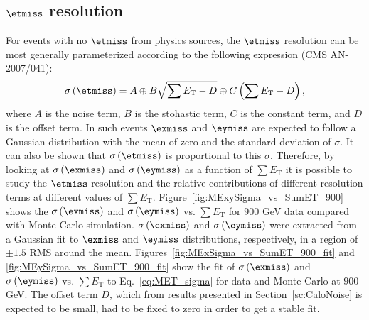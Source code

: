 \clearpage

\subsection{$\etmiss$ resolution}

For events with no $\etmiss$ from physics sources, the $\etmiss$ resolution can be most generally parameterized
according to the following expression (CMS AN-2007/041):
\begin{equation}
  \sigma\left(\etmiss\right)=A \oplus B\sqrt{\sum E_\text{T}-D} \oplus C\left(\sum E_\text{T}-D\right),
  \label{eq:MET_sigma}
\end{equation}
where $A$ is the noise term, $B$ is the stohastic term, $C$ is the constant term, and $D$ is the offset term. In such events
$\exmiss$ and $\eymiss$ are expected to follow a Gaussian distribution with the mean of zero and the standard deviation
of $\sigma$. It can also be shown that $\sigma\left(\etmiss\right)$ is proportional to this $\sigma$. Therefore,
by looking at $\sigma\left(\exmiss\right)$ and $\sigma\left(\eymiss\right)$ as a function of $\sum E_\text{T}$ it is possible to
study the $\etmiss$ resolution and the relative contributions of different resolution terms at different values of $\sum E_\text{T}$.
Figure~\ref{fig:MExySigma_vs_SumET_900} shows the $\sigma\left(\exmiss\right)$ and $\sigma\left(\eymiss\right)$ 
vs. $\sum E_\text{T}$ for 900 GeV data compared with Monte Carlo simulation. $\sigma\left(\exmiss\right)$ and $\sigma\left(\eymiss\right)$
were extracted from a Gaussian fit to $\exmiss$ and $\eymiss$ distributions, respectively, in a region of $\pm 1.5$ RMS around the mean.
Figures~\ref{fig:MExSigma_vs_SumET_900_fit} and \ref{fig:MEySigma_vs_SumET_900_fit} show the fit of $\sigma\left(\exmiss\right)$
 and $\sigma\left(\eymiss\right)$ vs. $\sum E_\text{T}$ to Eq.~\ref{eq:MET_sigma} for data and Monte Carlo at $900$ GeV.
The offset term $D$, which from results presented in Section~\ref{sc:CaloNoise} is expected to be small, had to be fixed to zero in 
order to get a stable fit.

